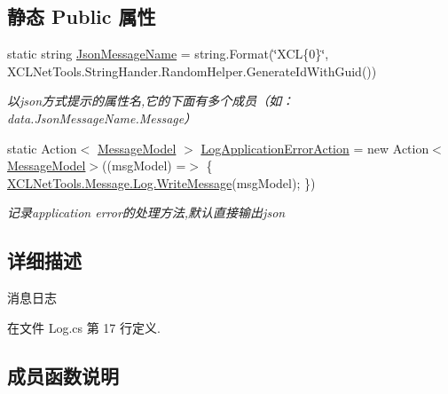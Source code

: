 \subsection*{静态 Public 属性}
\begin{DoxyCompactItemize}
\item 
static string \hyperlink{class_x_c_l_net_tools_1_1_message_1_1_log_ac9218999b3da2b5fbd7476e1ae47ca71}{Json\+Message\+Name} = string.\+Format(\char`\"{}X\+CL\{0\}\char`\"{}, X\+C\+L\+Net\+Tools.\+String\+Hander.\+Random\+Helper.\+Generate\+Id\+With\+Guid())
\begin{DoxyCompactList}\small\item\em 以json方式提示的属性名,它的下面有多个成员（如：data.\+Json\+Message\+Name.\+Message） \end{DoxyCompactList}\item 
static Action$<$ \hyperlink{class_x_c_l_net_tools_1_1_message_1_1_message_model}{Message\+Model} $>$ \hyperlink{class_x_c_l_net_tools_1_1_message_1_1_log_aeb571cf7294cbdc7776e44c5654b28d4}{Log\+Application\+Error\+Action} = new Action$<$\hyperlink{class_x_c_l_net_tools_1_1_message_1_1_message_model}{Message\+Model}$>$((msg\+Model) =$>$ \{ \hyperlink{class_x_c_l_net_tools_1_1_message_1_1_log_aac683d4043b6c9ac98f74d5f95dfa6f0}{X\+C\+L\+Net\+Tools.\+Message.\+Log.\+Write\+Message}(msg\+Model); \})
\begin{DoxyCompactList}\small\item\em 记录application error的处理方法,默认直接输出json \end{DoxyCompactList}\end{DoxyCompactItemize}


\subsection{详细描述}
消息日志 



在文件 Log.\+cs 第 17 行定义.



\subsection{成员函数说明}
\mbox{\label{class_x_c_l_net_tools_1_1_message_1_1_log_aac683d4043b6c9ac98f74d5f95dfa6f0}} 
